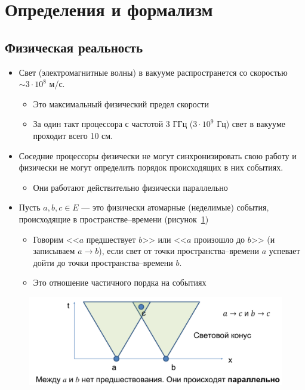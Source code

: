 \documentclass[10pt,a4paper,oneside,titlepage]{article}
\theoremstyle{plain}
\theoremstyle{defenition}
\begin{document}
\section{Определения и формализм}
\subsection{Физическая реальность}
\begin{itemize}
	\item Свет (электромагнитные волны) в вакууме распространется со скоростью $\sim3\cdot10^8$ м/с.
	\begin{itemize}
		\item Это максимальный физический предел скорости
		\item За один такт процессора с частотой 3 ГГц ($3\cdot10^9$ Гц) свет в вакууме проходит всего 10 см.
	\end{itemize}
    \item Соседние процессоры физически не могут синхронизировать свою работу и физически не могут определить порядок происходящих в них событиях.
    \begin{itemize}
    	\item Они работают действительно физически параллельно
    \end{itemize}
    \item Пусть $a, b, c\in E$ --- это физически атомарные (неделимые) события, происходящие в пространстве--времени (рисунок~\ref{fig:model2})
    \begin{itemize}
    	\item Говорим <<$a$ предшествует $b$>> или <<$a$ произошло до $b$>> (и записываем $a\to b$), если свет от точки пространства--времени $a$ успевает дойти до точки пространства--времени $b$.
    	\item Это отношение частичного пордка на событиях
    \end{itemize}
\end{itemize}

\begin{figure}[h!]
	\centering
	\includegraphics[width=0.5\linewidth]{pictures/Model2}
	\caption{}
	\label{fig:model2}
\end{figure}
\end{document}
